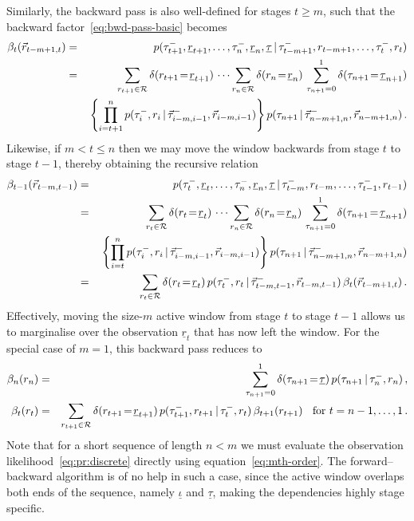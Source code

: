 \documentclass[a4paper]{article}
\newcommand{\ui}{\underline{\iota}}
\newcommand{\ut}{\underline{\tau}}
\newcommand{\ur}{\underline{r}}
\newcommand{\vr}{\vec{r}}
\newcommand{\tm}{\tau^{-}}
\begin{document}
Similarly, the backward pass is also well-defined for stages $t\ge m$, such that the backward factor~\eqref{eq:bwd-pass-basic} becomes
\begin{eqnarray}
\beta_t(\vr_{t-m+1,t}) & = & 
p(\tm_{t+1},\ur_{t+1},\ldots,\tm_n,\ur_n,\ut\,|\,\tm_{t-m+1},r_{t-m+1},\ldots,\tm_t,r_t)
\nonumber\\& = &
\sum_{r_{t+1}\in{\cal R}} \delta(r_{t+1}\!=\!\ur_{t+1})\,\cdots
\sum_{r_{n}\in{\cal R}} \delta(r_{n}\!=\!\ur_{n})\,
\sum_{\tau_{n+1}=0}^{1}\delta(\tau_{n+1}\!=\!\ut_{n+1})
\nonumber\\
&&{}
\left\{\prod_{i=t+1}^n
p(\tm_{i},r_{i}\,|\,\vec{\tau}^-_{i-m,i-1},\vr_{i-m,i-1})\right\}
p(\tau_{n+1}\,|\,\vec{\tau}^-_{n-m+1,n},\vr_{n-m+1,n})
\,.
\end{eqnarray}
Likewise, if $m<t\le n$ then we may move the window backwards from stage $t$ to stage $t-1$, thereby obtaining the recursive relation
\begin{eqnarray}
\beta_{t-1}(\vr_{t-m,t-1}) & = & 
p(\tm_{t},\ur_{t},\ldots,\tm_n,\ur_n,\ut\,|\,\tm_{t-m},r_{t-m},\ldots,\tm_{t-1},r_{t-1})
\nonumber\\& = &
\sum_{r_{t}\in{\cal R}} \delta(r_{t}\!=\!\ur_{t})\,\cdots
\sum_{r_{n}\in{\cal R}} \delta(r_{n}\!=\!\ur_{n})\,
\sum_{\tau_{n+1}=0}^{1}\delta(\tau_{n+1}\!=\!\ut_{n+1})
\nonumber\\
&&{}
\left\{\prod_{i=t}^n
p(\tm_{i},r_{i}\,|\,\vec{\tau}^-_{i-m,i-1},\vr_{i-m,i-1})\right\}
p(\tau_{n+1}\,|\,\vec{\tau}^-_{n-m+1,n},\vr_{n-m+1,n})
\nonumber\\& = &
\sum_{r_{t}\in{\cal R}} \delta(r_{t}\!=\!\ur_{t})\,
p(\tm_{t},r_{t}\,|\,\vec{\tau}^-_{t-m,t-1},\vr_{t-m,t-1})\,\beta_{t}(\vr_{t-m+1,t})
\,.
\end{eqnarray}
Effectively, moving the size-$m$ active window from stage $t$ to stage $t-1$ allows us to marginalise over the
observation $\ur_{t}$ that has now left the window.
For the special case of $m=1$, this backward pass reduces to
\begin{eqnarray}
\beta_n(r_n) & = &  \sum_{\tau_{n+1}=0}^{1}\delta(\tau_{n+1}\!=\!\ut)\,
p(\tau_{n+1}\,|\,\tm_n,r_n)\,,
\nonumber\\
\beta_{t}(r_{t}) & = &
\sum_{r_{t+1}\in{\cal R}} \delta(r_{t+1}\!=\!\ur_{t+1})\,
p(\tm_{t+1},r_{t+1}\,|\,\tm_{t},r_{t})
\,\beta_{t+1}(r_{t+1})\hspace*{2mm}\mbox{ for $t=n-1,\ldots,1$}
\,.
\end{eqnarray}
Note that for a short sequence of length $n<m$ we must evaluate the observation likelihood~\eqref{eq:pr:discrete} directly using
equation~\eqref{eq:mth-order}. The forward--backward algorithm is of no help in such a case, since the active window overlaps
both ends of the sequence, namely $\ui$ and $\ut$, making the dependencies highly stage specific.
\end{document}
